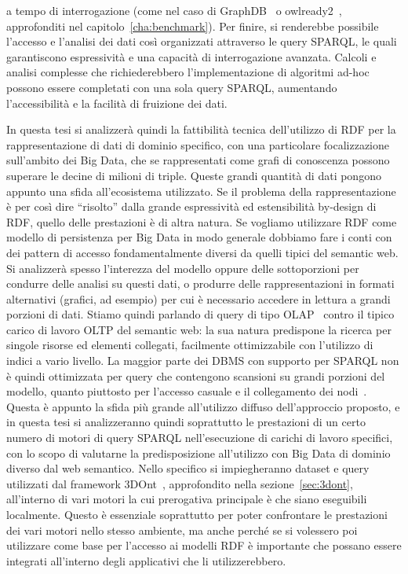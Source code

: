 a tempo di interrogazione (come nel caso di GraphDB~\cite{bishop2011owlim} o owlready2~\cite{lamy2017owlready}, approfonditi nel capitolo~\ref{cha:benchmark}).
Per finire, si renderebbe possibile l'accesso e l'analisi dei dati così organizzati attraverso le query SPARQL, le quali garantiscono
espressività e una capacità di interrogazione avanzata. Calcoli e analisi complesse che richiederebbero l'implementazione di algoritmi
ad-hoc possono essere completati con una sola query SPARQL, aumentando l'accessibilità e la facilità di fruizione dei dati.
\par
In questa tesi si analizzerà quindi la fattibilità tecnica dell'utilizzo di RDF per la rappresentazione di dati 
di dominio specifico, con una particolare focalizzazione sull'ambito dei Big Data, che se rappresentati come 
grafi di conoscenza possono superare le decine di milioni di triple.
Queste grandi quantità di dati pongono appunto una sfida all'ecosistema utilizzato. Se il problema della rappresentazione è per
così dire ``risolto'' dalla grande espressività ed estensibilità by-design di RDF, quello delle prestazioni è di altra natura.
Se vogliamo utilizzare RDF come modello di persistenza per Big Data in modo generale dobbiamo fare i conti con dei pattern di accesso
fondamentalmente diversi da quelli tipici del semantic web. Si analizzerà spesso l'interezza del modello oppure
delle sottoporzioni per condurre delle analisi su questi dati, o produrre delle rappresentazioni in formati alternativi
(grafici, ad esempio) per cui è necessario accedere in lettura a grandi porzioni di dati. Stiamo quindi parlando di query di tipo OLAP~\cite{codd1998olap,chaudhuri1997olap}
contro il tipico carico di lavoro OLTP del semantic web: la sua natura predispone la ricerca per singole risorse ed elementi collegati,
facilmente ottimizzabile con l'utilizzo di indici a vario livello. La maggior parte dei DBMS con supporto per SPARQL non è quindi
ottimizzata per query che contengono scansioni su grandi porzioni del modello, quanto piuttosto per l'accesso casuale e
il collegamento dei nodi~\cite{ali2022survey}.
Questa è appunto la sfida più grande all'utilizzo diffuso dell'approccio proposto, e in questa tesi si analizzeranno quindi soprattutto
le prestazioni di un certo numero di motori di query SPARQL nell'esecuzione di carichi di lavoro specifici,
con lo scopo di valutarne la predisposizione all'utilizzo con Big Data di dominio diverso dal web semantico.
Nello specifico si impiegheranno dataset e query utilizzati dal framework 3DOnt~\cite{codiglione2024urban,codiglione2024heritage},
approfondito nella sezione~\ref{sec:3dont},
all'interno di vari motori la cui prerogativa principale è che siano eseguibili localmente. Questo è essenziale soprattutto per
poter confrontare le prestazioni dei vari motori nello stesso ambiente, ma anche perché se si volessero poi utilizzare come base
per l'accesso ai modelli RDF è importante che possano essere integrati all'interno degli applicativi che li utilizzerebbero.

